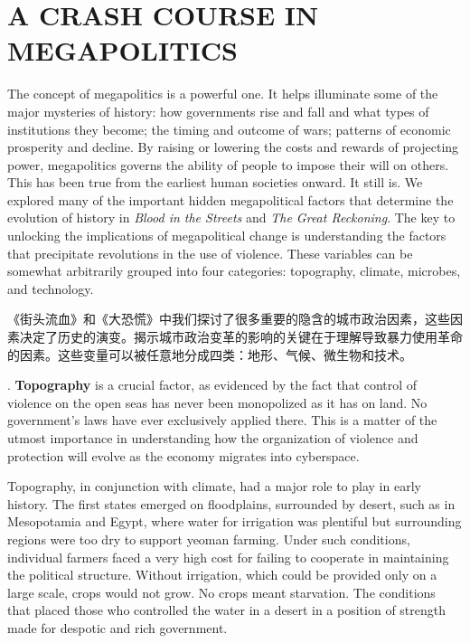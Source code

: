 \section{A CRASH COURSE IN MEGAPOLITICS}
\begin{paracol}{2}
The concept of megapolitics is a powerful one. It helps illuminate some of the major mysteries of history: how governments rise and fall and what types of institutions they become; the timing and outcome of wars; patterns of economic prosperity and decline. By raising or lowering the costs and rewards of projecting power, megapolitics governs the ability of people to impose their will on others. This has been true from the earliest human societies onward. It still is. We explored many of the important hidden megapolitical factors that determine the evolution of history in \emph{Blood in the Streets} and \emph{The Great Reckoning}. The key to unlocking the implications of megapolitical change is understanding the factors that precipitate revolutions in the use of violence. These variables can be somewhat arbitrarily grouped into four categories: topography, climate, microbes, and technology.

\switchcolumn
《街头流血》和《大恐慌》中我们探讨了很多重要的隐含的城市政治因素，这些因素决定了历史的演变。揭示城市政治变革的影响的关键在于理解导致暴力使用革命的因素。这些变量可以被任意地分成四类：地形、气候、微生物和技术。

. \textbf{Topography} is a crucial factor, as evidenced by the fact that control of violence on the open seas has never been monopolized as it has on land. No government's laws have ever exclusively applied there. This is a matter of the utmost importance in understanding how the organization of violence and protection will evolve as the economy migrates into cyberspace.

Topography, in conjunction with climate, had a major role to play in early history. The first states emerged on floodplains, surrounded by desert, such as in Mesopotamia and Egypt, where water for irrigation was plentiful but surrounding regions were too dry to support yeoman farming. Under such conditions, individual farmers faced a very high cost for failing to cooperate in maintaining the political structure. Without irrigation, which could be provided only on a large scale, crops would not grow. No crops meant starvation. The conditions that placed those who controlled the water in a desert in a position of strength made for despotic and rich government.


\end{paracol}
